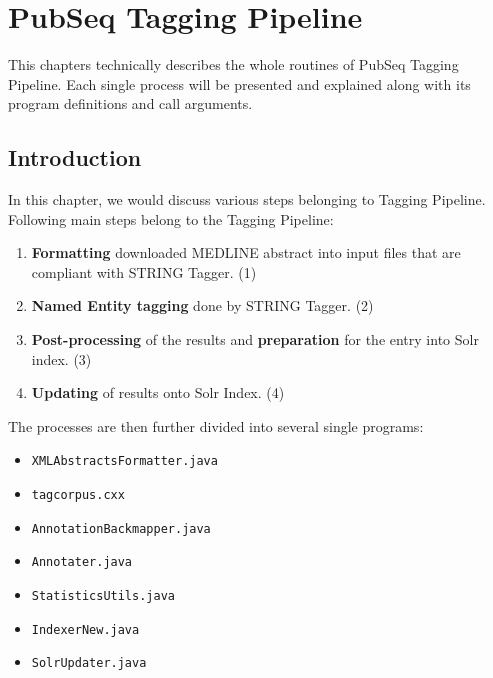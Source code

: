 
\chapter{PubSeq Tagging Pipeline} %

\label{Chapter4} %


This chapters technically describes the whole routines of PubSeq Tagging Pipeline. Each single process will be presented and explained along with its program definitions and call arguments.


\section{Introduction}

In this chapter, we would discuss various steps belonging to Tagging Pipeline. Following main steps belong to the Tagging Pipeline:

\begin{enumerate}
\item \textbf{Formatting} downloaded MEDLINE abstract into input files that are compliant with STRING  Tagger. \label{itm:TaggingStep1} (1)
\item \textbf{Named Entity tagging} done by STRING Tagger. \label{itm:TaggingStep2} (2)
\item \textbf{Post-processing} of the results and \textbf{preparation} for the entry into Solr index. \label{itm:TaggingStep3} (3)
\item \textbf{Updating} of results onto Solr Index. \label{itm:TaggingStep4} (4)
\end{enumerate}

The processes are then further divided into several single programs:

\begin{itemize}
\item \texttt{XMLAbstractsFormatter.java}
\item \texttt{tagcorpus.cxx}
\item \texttt{AnnotationBackmapper.java}
\item \texttt{Annotater.java}
\item \texttt{StatisticsUtils.java}
\item \texttt{IndexerNew.java}
\item \texttt{SolrUpdater.java}
\end{itemize}

